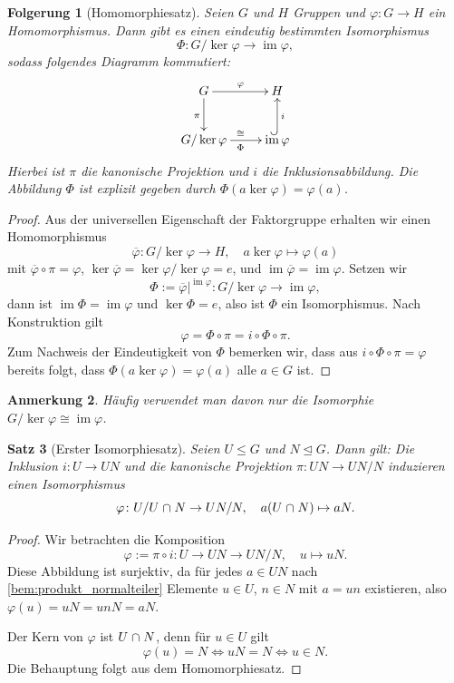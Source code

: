 \documentclass[a4paper, twoside, 11pt, ngerman]{report}
\DeclareMathOperator{\image}{im}
\renewcommand{\cap}{\;\rotatebox{90}{\reflectbox{\rotatebox{270}{$\cup$}}}\;}
\theoremstyle{definistyle}
\newtheorem{satz}{Satz}[section]
\newtheorem{anm}[satz]{Anmerkung}
\newtheorem{folgerung}[satz]{Folgerung}
\theoremstyle{remark}
\begin{document}
\begin{folgerung}[Homomorphiesatz]\label{folgerung:homomorhiesatz}
Seien $G$ und $H$ Gruppen und $\varphi \colon G \to H$ ein Homomorphismus. Dann gibt es einen eindeutig bestimmten Isomorphismus
\[
\Phi \colon G / \ker \varphi \to \image \varphi,
\]
sodass folgendes Diagramm kommutiert:
\[
\xymatrix{
G \ar[r]^{\varphi} \ar[d]_{\pi} & H \\
G / \ker \varphi \ar[r]^{\cong}_\Phi & \image \varphi \ar@{^{(}->}[u]_{i}
}
\]
Hierbei ist $\pi$ die kanonische Projektion und $i$ die Inklusionsabbildung. Die Abbildung $\Phi$ ist explizit gegeben durch $\Phi(a \ker \varphi) = \varphi(a)$.
\end{folgerung}

\begin{proof}
Aus der universellen Eigenschaft der Faktorgruppe erhalten wir einen Homomorphismus 
\[
\overline{\varphi} \colon G / \ker \varphi \to H, \quad a \ker \varphi \mapsto \varphi(a)
\]
mit $\overline{\varphi} \circ \pi = \varphi$, $\ker \overline{\varphi} = \ker \varphi / \ker \varphi = e$, und $\image \overline{\varphi} = \image \varphi$. Setzen wir
\[
\Phi := \overline{\varphi}|^{\image \varphi}\colon G/\ker\varphi \to\image\varphi,
\]
dann ist $\image \Phi = \image \varphi$ und $\ker \Phi = e$, also ist $\Phi$ ein Isomorphismus.
Nach Konstruktion gilt \[\varphi = \Phi \circ \pi = i \circ \Phi \circ \pi.\] 
Zum Nachweis der Eindeutigkeit von $\Phi$ bemerken wir, dass aus $i\circ\Phi\circ\pi=\varphi$
bereits folgt, dass $\Phi(a\ker\varphi)=\varphi(a)$ alle $a\in G$ ist.
\end{proof}

\begin{anm}\label{anm:iso_ker_phi}
Häufig verwendet man davon nur die Isomorphie $G / \ker \varphi \cong \image \varphi$.
\end{anm}

\begin{satz}[Erster Isomorphiesatz]\label{satz:erster_isomorphiesatz}
Seien $U \leq G$ und $N \trianglelefteq G$. Dann gilt: Die Inklusion $i \colon U \to UN$ und die kanonische Projektion $\pi \colon UN \to UN / N$ induzieren einen Isomorphismus
\[
\varphi \colon U / U \cap N \to UN / N, \quad a(U \cap N) \mapsto aN.
\]
\end{satz}

\begin{proof}
Wir betrachten die Komposition
\[
\varphi := \pi \circ i \colon U \to UN \to UN / N, \quad u \mapsto uN.
\]
Diese Abbildung ist surjektiv, da für jedes $a \in UN$ nach \ref{bem:produkt_normalteiler} Elemente $u \in U$, $n\in N$ mit $a = u n$ existieren, also $\varphi(u) = uN = unN=aN$. 

Der Kern von $\varphi$ ist $U \cap N$, denn für $u \in U$ gilt
\[\varphi(u) = N \iff uN=N \iff u \in N.\]
Die Behauptung folgt aus dem Homomorphiesatz.
\end{proof}
\end{document}

